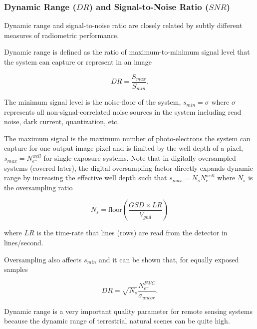 \documentclass[10pt,journal]{IEEEtran}  %
\begin{document}
\subsubsection{Dynamic Range ($DR$) and Signal-to-Noise Ratio ($SNR$)}

Dynamic range and signal-to-noise ratio are closely related by subtly different measures of radiometric performance.

Dynamic range is defined as the ratio of maximum-to-minimum signal level that the system can capture or represent in an image

\begin{equation*}
    DR = \frac{S_{max}}{S_{min}}.
\end{equation*}

The minimum signal level is the noise-floor of the system, $s_{min} = \sigma$ where $\sigma$ represents all non-signal-correlated noise sources in the system including read noise, dark current, quantization, etc.

The maximum signal is the maximum number of photo-electrons the system can capture for one output image pixel and is limited by the well depth of a pixel, $s_{max} = N_{e^-}^{well}$ for single-exposure systems.  Note that in digitally oversampled systems (covered later), the digital oversampling factor directly expands dynamic range by increasing the effective well depth such that $s_{max} = N_s N_{e^-}^{well}$ where $N_s$ is the oversampling ratio


\begin{equation}
    N_s = \text{floor}\left(\frac{GSD \times LR}{V_{gnd}}\right)
    \label{eq:N_s}
\end{equation}

where $LR$ is the time-rate that lines (rows) are read from the detector in lines/second.

Oversampling also affects $s_{min}$ and it can be shown that, for equally exposed samples

\begin{equation}
    DR = \sqrt{N_s}\frac{N_{e^-}^{FWC}}{\sigma_{uncor}}.
\label{eq:DR_OS}
\end{equation}

Dynamic range is a very important quality parameter for remote sensing systems because the dynamic range of terrestrial natural scenes can be quite high. 
\end{document}
